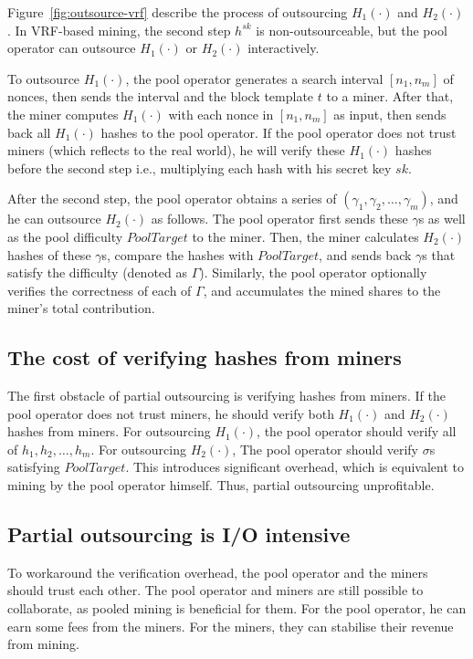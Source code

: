 Figure~\ref{fig:outsource-vrf} describe the process of outsourcing $H_1(\cdot)$ and $H_2(\cdot)$.
In VRF-based mining, the second step $h^{sk}$ is non-outsourceable, but the pool operator can outsource $H_1(\cdot)$ or $H_2(\cdot)$ interactively.

To outsource $H_1(\cdot)$, the pool operator generates a search interval $[n_1, n_m]$ of nonces, then sends the interval and the block template $t$ to a miner.
After that, the miner computes $H_1(\cdot)$ with each nonce in $[n_1, n_m]$ as input, then sends back all $H_1(\cdot)$ hashes to the pool operator.
If the pool operator does not trust miners (which reflects to the real world), he will verify these $H_1(\cdot)$ hashes before the second step i.e., multiplying each hash with his secret key $sk$.

After the second step, the pool operator obtains a series of $(\gamma_1, \gamma_2, \dots, \gamma_m)$, and he can outsource $H_2(\cdot)$ as follows.
The pool operator first sends these $\gamma$s as well as the pool difficulty $PoolTarget$ to the miner.
Then, the miner calculates $H_2(\cdot)$ hashes of these $\gamma$s, compare the hashes with $PoolTarget$, and sends back $\gamma$s that satisfy the difficulty (denoted as $\Gamma$).
Similarly, the pool operator optionally verifies the correctness of each of $\Gamma$, and accumulates the mined shares to the miner's total contribution.


\subsection{The cost of verifying hashes from miners}

The first obstacle of partial outsourcing is verifying hashes from miners.
If the pool operator does not trust miners, he should verify both $H_1(\cdot)$ and $H_2(\cdot)$ hashes from miners.
For outsourcing $H_1(\cdot)$, the pool operator should verify all of $h_1, h_2, \dots, h_m$.
For outsourcing $H_2(\cdot)$, The pool operator should verify $\sigma$s satisfying $PoolTarget$.
This introduces significant overhead, which is equivalent to mining by the pool operator himself.
Thus, partial outsourcing unprofitable.


\subsection{Partial outsourcing is I/O intensive}

To workaround the verification overhead, the pool operator and the miners should trust each other.
The pool operator and miners are still possible to collaborate, as pooled mining is beneficial for them.
For the pool operator, he can earn some fees from the miners.
For the miners, they can stabilise their revenue from mining.

